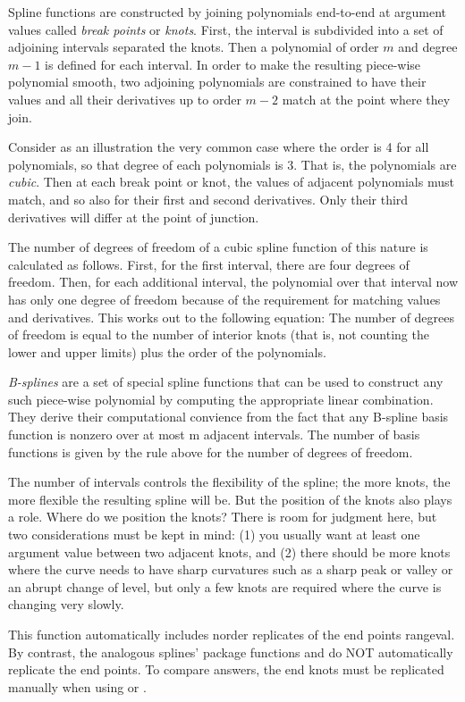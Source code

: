 \documentclass{article}
\begin{document}
\begin{Details}\relax
Spline functions are constructed by joining polynomials end-to-end at
argument values called \emph{break points} or \emph{knots}. First, the
interval is subdivided into a set of adjoining intervals
separated the knots.  Then a polynomial of order $m$ and
degree $m-1$ is defined for each interval.  In order to make the
resulting piece-wise polynomial smooth, two adjoining polynomials are
constrained to have their values and all their derivatives up to order
$m-2$ match at the point where they join.

Consider as an illustration the very common case where the order is 4 
for all polynomials, so that degree of each polynomials is 3.  That
is, the polynomials are \emph{cubic}.  Then at each break point or
knot, the values of adjacent polynomials must match, and so also for
their first and second derivatives.  Only their third derivatives will
differ at the point of junction.

The number of degrees of freedom of a cubic spline function of this
nature is calculated as follows.  First, for the first interval, there
are four degrees of freedom.  Then, for each additional interval, the
polynomial over that interval now has only one degree of freedom
because of the requirement for matching values and derivatives.  This
works out to the following equation:  The number of degrees of freedom
is equal to the number of interior knots (that is, not counting the
lower and upper limits) plus the order of the polynomials.

\emph{B-splines} are a set of special spline functions that can be
used to construct any such piece-wise polynomial by computing the
appropriate linear combination.  They derive their computational
convience from the fact that any B-spline basis function is nonzero
over at most m adjacent intervals.  The number of basis functions is
given by the rule above for the number of degrees of freedom.

The number of intervals controls the flexibility of the spline;  the
more knots, the more flexible the resulting spline will be. But the 
position of the knots also plays a role.  Where do we position the
knots?  There is room for judgment here, but two considerations must
be kept in mind:  (1) you usually want at least one argument value
between two adjacent knots, and (2)  there should be more knots where
the curve needs to have sharp curvatures such as a sharp peak or
valley or an abrupt change of level, but only a few knots are required
where the curve is changing very slowly.

This function automatically includes norder replicates of the end
points rangeval.  By contrast, the analogous splines' package
functions  and 
do NOT automatically replicate the end points.  To compare answers,
the end knots must be replicated manually when using
 or .
\end{Details}
\end{document}
